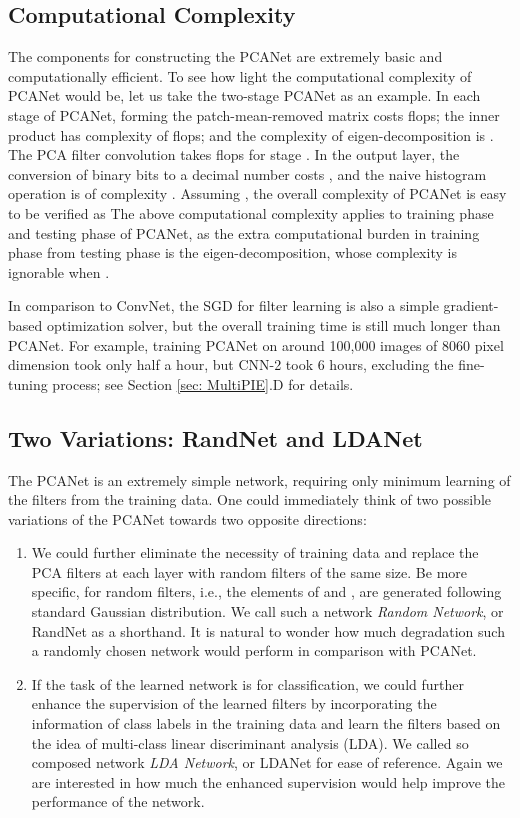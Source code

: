 \documentclass[10pt,journal,compsoc]{IEEEtran}
\begin{document}
{
\subsection{Computational Complexity}
The components for constructing the PCANet are extremely basic and computationally efficient. To see how light the computational complexity of PCANet would be, let us take the two-stage PCANet as an example. In each stage of PCANet, forming the patch-mean-removed matrix  costs  flops; the inner product  has complexity of  flops; and the complexity of eigen-decomposition is . The PCA filter convolution takes  flops for stage . In the output layer, the conversion of  binary bits to a decimal number costs , and the naive histogram operation is of complexity . Assuming , the overall complexity of PCANet is easy to be verified as 
The above computational complexity applies to training phase and testing phase of PCANet, as the extra computational burden in training phase from testing phase is the eigen-decomposition, whose complexity is ignorable when .

In comparison to ConvNet, the SGD for filter learning is also a simple gradient-based optimization solver, but the overall training time is still much longer than PCANet. For example, training PCANet on around 100,000 images of 8060 pixel dimension took only half a hour, but CNN-2 took 6 hours, excluding the fine-tuning process; see Section \ref{sec: MultiPIE}.D for details.
}


\subsection{Two Variations: RandNet and LDANet}\label{sec: Extensions}
The PCANet is an extremely simple network, requiring only minimum learning of the filters from the training data. One could immediately think of two possible variations of the PCANet towards two opposite directions:
\begin{enumerate}
\item We could further eliminate the necessity of training data and replace the PCA filters at each layer with random filters of the same size. Be more specific, for random filters, i.e., the elements of  and , are generated following standard Gaussian distribution. We call such a network {\em Random Network}, or RandNet as a shorthand. It is natural to wonder how much degradation such a randomly chosen network would perform in comparison with PCANet.
\item If the task of the learned network is for classification, we could further enhance the supervision of the learned filters by incorporating the information of class labels in the training data and learn the filters based on the idea of multi-class linear discriminant analysis (LDA). We called so composed network {\em LDA Network}, or LDANet for ease of reference. Again we are interested in how much the enhanced supervision would help improve the performance of the network.
\end{enumerate}
\end{document}
